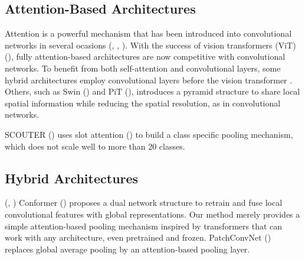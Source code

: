\subsection{Attention-Based Architectures}
\label{rel:sub_att}
Attention is a powerful mechanism that has been introduced into convolutional networks in several 
ocasions (\cite{bello2019attention}, \cite{ramachandran2019stand}, \cite{shen2020global}). 
With the success of vision transformers (ViT) (\cite{dosovitskiy2020image}), fully attention-based 
architectures are now competitive with convolutional networks. To benefit from both self-attention 
and convolutional layers, some hybrid architectures employ convolutional layers before the vision transformer 
. Others, such as Swin (\cite{liu2021swin}) and PiT 
(\cite{heo2021rethinking}), introduces a pyramid structure to share local spatial information 
while reducing the spatial resolution, as in convolutional networks. 

SCOUTER (\cite{li2021scouter}) uses slot attention (\cite{locatello2020object}) to build a class 
specific pooling mechanism, which does not scale well to more than 20 classes. 

\subsection{Hybrid Architectures}
\label{rel:sub_hybrid}
(\cite{graham2021levit}, \cite{xiao2021early})
Conformer (\cite{peng2021conformer}) proposes a dual network structure to retrain and fuse local 
convolutional features with global representations. Our method merely provides a simple 
attention-based pooling mechanism inspired by transformers that can work with any architecture, 
even pretrained and frozen. PatchConvNet (\cite{touvron2021augmenting}) replaces global average pooling by an 
attention-based pooling layer.
